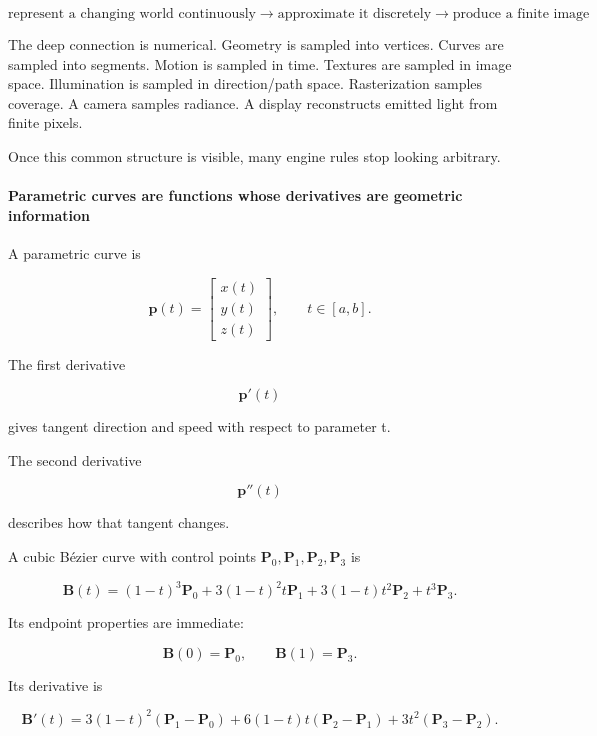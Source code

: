 \[
\boxed{
\text{represent a changing world continuously}
\rightarrow
\text{approximate it discretely}
\rightarrow
\text{produce a finite image}
}
\]

The deep connection is numerical. Geometry is sampled into vertices. Curves are sampled into segments. Motion is sampled in time. Textures are sampled in image space. Illumination is sampled in direction/path space. Rasterization samples coverage. A camera samples radiance. A display reconstructs emitted light from finite pixels.

Once this common structure is visible, many engine rules stop looking arbitrary.

\paragraph{Parametric curves are functions whose derivatives are geometric information}\label{03-visual-computing-i-ch001-parametric-curves-are-functions-whose-derivatives-are-geometric-information}

\hypertarget{03-visual-computing-i-ch001-parametric-curves-are-functions-whose-derivatives-are-geometric-information}{}

A parametric curve is

\[
\mathbf p(t)=
\begin{bmatrix}
x(t)\\
y(t)\\
z(t)
\end{bmatrix},
\qquad
t\in[a,b].
\]

The first derivative

\[
\mathbf p'(t)
\]

gives tangent direction and speed with respect to parameter t.

The second derivative

\[
\mathbf p''(t)
\]

describes how that tangent changes.

A cubic Bézier curve with control points \(\mathbf P_0,\mathbf P_1,\mathbf P_2,\mathbf P_3\) is

\[
\mathbf B(t)
=
(1-t)^3\mathbf P_0
+
3(1-t)^2t\mathbf P_1
+
3(1-t)t^2\mathbf P_2
+
t^3\mathbf P_3.
\]

Its endpoint properties are immediate:

\[
\mathbf B(0)=\mathbf P_0,
\qquad
\mathbf B(1)=\mathbf P_3.
\]

Its derivative is

\[
\mathbf B'(t)
=
3(1-t)^2(\mathbf P_1-\mathbf P_0)
+
6(1-t)t(\mathbf P_2-\mathbf P_1)
+
3t^2(\mathbf P_3-\mathbf P_2).
\]

